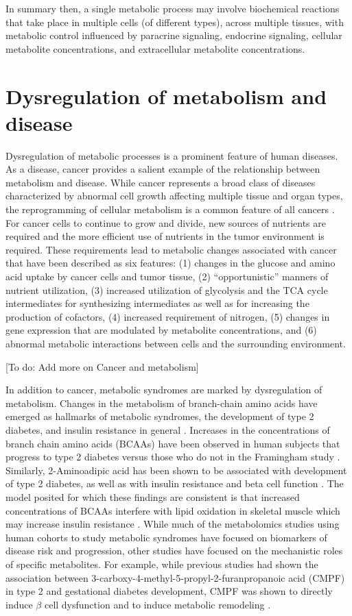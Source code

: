 \begin{DoubleSpace*}
In summary then, a single metabolic process may involve biochemical reactions that take place in multiple cells (of different types), across multiple tissues, with metabolic control influenced by paracrine signaling, endocrine signaling, cellular metabolite concentrations, and extracellular metabolite concentrations.

\section{Dysregulation of metabolism and disease}
Dysregulation of metabolic processes is a prominent feature of human diseases. As a disease, cancer provides a salient example of the relationship between metabolism and disease. While cancer represents a broad class of diseases characterized by abnormal cell growth affecting multiple tissue and organ types, the reprogramming of cellular metabolism is a common feature of all cancers \cite{pavlova2016}. For cancer cells to continue to grow and divide, new sources of nutrients are required and the more efficient use of nutrients in the tumor environment is required. These requirements lead to metabolic changes associated with cancer that have been described \cite{pavlova2016} as six features: (1) changes in the glucose and amino acid uptake by cancer cells and tumor tissue, (2) ``opportunistic'' manners of nutrient utilization, (3) increased utilization of glycolysis and the TCA cycle intermediates for synthesizing intermediates as well as for increasing the production of cofactors, (4) increased requirement of nitrogen, (5) changes in gene expression that are modulated by metabolite concentrations, and (6) abnormal metabolic interactions between cells and the surrounding environment. 

[To do: Add more on Cancer and metabolism] 

In addition to cancer, metabolic syndromes are marked by dysregulation of metabolism. Changes in the metabolism of branch-chain amino acids have emerged as hallmarks of metabolic syndromes, the development of type 2 diabetes, and insulin resistance in general \cite{newgard2017}. Increases in the concentrations of branch chain amino acids (BCAAs) have been observed in human subjects that progress to type 2 diabetes versus those who do not in the Framingham study \cite{wang2011}. Similarly, 2-Aminoadipic acid has been shown to be associated with development of type 2 diabetes, as well as with insulin resistance and beta cell function \cite{wang2013}. The model posited for which these findings are consistent is that increased concentrations of BCAAs interfere with lipid oxidation in skeletal muscle which may increase insulin resistance \cite{newgard2017}. While much of the metabolomics studies using human cohorts to study metabolic syndromes have focused on biomarkers of disease risk and progression, other studies have focused on the mechanistic roles of specific metabolites. For example, while previous studies had shown the association between  3-carboxy-4-methyl-5-propyl-2-furanpropanoic acid (CMPF) in type 2 and gestational diabetes development, CMPF was shown to directly induce $\beta$ cell dysfunction \cite{prentice2014} and to induce metabolic remodeling \cite{liu2016}.


\end{DoubleSpace*}
